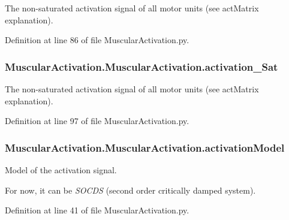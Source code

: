 The non-\/saturated activation signal of all motor units (see act\+Matrix explanation). 



Definition at line 86 of file Muscular\+Activation.\+py.

\subsubsection[{\texorpdfstring{activation\+\_\+\+Sat}{activation_Sat}}]{\setlength{\rightskip}{0pt plus 5cm}Muscular\+Activation.\+Muscular\+Activation.\+activation\+\_\+\+Sat}\hypertarget{class_muscular_activation_1_1_muscular_activation_aab99ef4f19e7af03fccc71d7dc3571d1}{}\label{class_muscular_activation_1_1_muscular_activation_aab99ef4f19e7af03fccc71d7dc3571d1}


The non-\/saturated activation signal of all motor units (see act\+Matrix explanation). 



Definition at line 97 of file Muscular\+Activation.\+py.

\subsubsection[{\texorpdfstring{activation\+Model}{activationModel}}]{\setlength{\rightskip}{0pt plus 5cm}Muscular\+Activation.\+Muscular\+Activation.\+activation\+Model}\hypertarget{class_muscular_activation_1_1_muscular_activation_ab4f37563ac079f439a4bc78cf401588c}{}\label{class_muscular_activation_1_1_muscular_activation_ab4f37563ac079f439a4bc78cf401588c}


Model of the activation signal. 

For now, it can be {\itshape S\+O\+C\+DS} (second order critically damped system). 

Definition at line 41 of file Muscular\+Activation.\+py.


